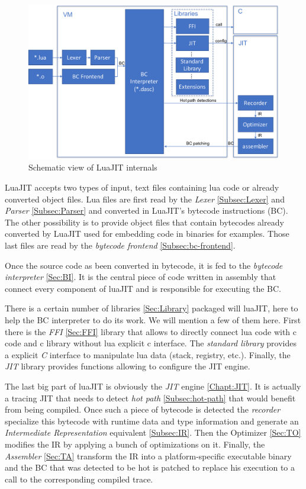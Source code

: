 \begin{figure}[H]
    \centering
	\includegraphics[width=\textwidth]{./Images/LuaJIT.pdf}
    \caption{Schematic view of LuaJIT internals}
    \label{fig:luajit-internal}
\end{figure}{}

LuaJIT accepts two types of input,
text files containing lua code or already converted object files. Lua files are
first read by the \emph{Lexer} \ref{Subsec:Lexer} and \emph{Parser} \ref{Subsec:Parser} and
converted in LuaJIT's bytecode instructions (BC). The other possibility is to provide
object files that contain bytecodes already converted by LuaJIT used for
embedding code in binaries for examples. Those last files are read by the
\emph{bytecode frontend} \ref{Subsec:bc-frontend}.

Once the source code as been converted in bytecode, it is fed to the \emph{bytecode
interpreter} \ref{Sec:BI}. It is the central piece of code written in assembly
that connect every component of luaJIT and is responsible for executing the BC.

There is a certain number of libraries \ref{Sec:Library} packaged will luaJIT, here
to help the BC interpreter to do its work. We will mention a few of them here.
First there is the \emph{FFI} \ref{Sec:FFI} library that allows to directly connect lua
code with c code and c library without lua explicit c interface. The \emph{standard
library} provides a explicit \emph{C} interface to manipulate lua data
(stack, registry, etc.). Finally, the \emph{JIT} library provides functions
allowing to configure the JIT engine.

The last big part of luaJIT is obviously the \emph{JIT} engine \ref{Chapt:JIT}.
It is actually a tracing JIT that needs to detect \emph{hot path}
\ref{Subsec:hot-path} that would benefit from being compiled. Once such a piece
of bytecode is detected the \emph{recorder} specialize this bytecode with runtime
data and type information and generate an \emph{Intermediate Representation}
equivalent \ref{Subsec:IR}. Then the Optimizer \ref{Sec:TO} modifies the IR by
applying a bunch of optimizations on it. Finally, the \emph{Assembler} \ref{Sec:TA}
transform the IR into a platform-specific executable binary and the BC that was
detected to be hot is patched to replace his execution to a call to the
corresponding compiled trace.
